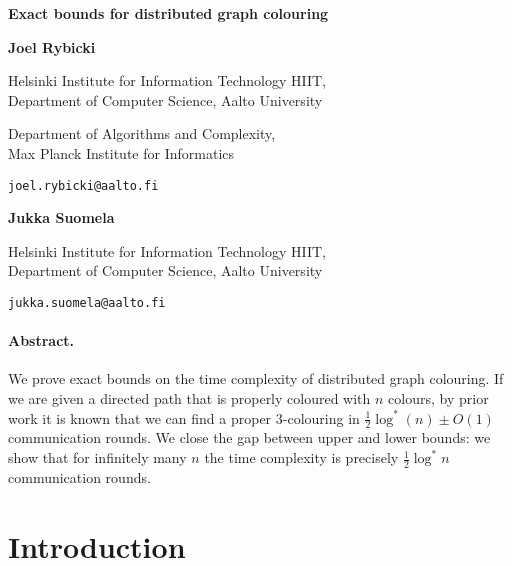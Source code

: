 \documentclass[a4paper,11pt]{article}
\theoremstyle{remark}
\newcommand{\logst}{\log^{*}}
\newenvironment{mycover}
               {\list{}{\listparindent 0pt
                        \itemindent    \listparindent
                        \leftmargin    0pt
                        \rightmargin   0pt
                        \parsep        0pt}\raggedright
                \item\relax}
               {\endlist}
\begin{document}

\begin{mycover}
{\LARGE \textbf{Exact bounds for distributed graph colouring}\par}

\bigskip

\medskip
\textbf{Joel Rybicki}\\

\smallskip
{\small Helsinki Institute for Information Technology HIIT, \\
Department of Computer Science, Aalto University

\medskip
Department of Algorithms and Complexity, \\
Max Planck Institute for Informatics

\medskip
\nolinkurl{joel.rybicki@aalto.fi}\par}

\bigskip
\textbf{Jukka Suomela}\\

\smallskip
{\small Helsinki Institute for Information Technology HIIT, \\
Department of Computer Science, Aalto University

\medskip
\nolinkurl{jukka.suomela@aalto.fi}\par}

\end{mycover}

\bigskip

\paragraph{Abstract.}

We prove exact bounds on the time complexity of distributed graph colouring. If we are given a directed path that is properly coloured with $n$ colours, by prior work it is known that we can find a proper $3$-colouring in $\frac{1}{2} \logst(n) \pm O(1)$ communication rounds. We close the gap between upper and lower bounds: we show that for infinitely many $n$ the time complexity is precisely $\frac{1}{2} \logst n$ communication rounds.

\thispagestyle{empty}
\setcounter{page}{0}
\newpage



\section{Introduction}
\end{document}
